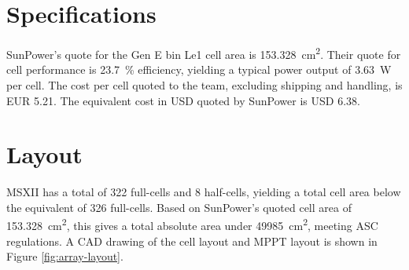 \documentclass[10pt]{article}
\begin{document}
\section{Specifications}
SunPower's quote for the Gen E bin Le1 cell area is \SI{153.328}{\centi\metre\squared}.
Their quote for cell performance is \SI{23.7}{\percent} efficiency, yielding a typical power output of \SI{3.63}{\watt} per cell.
The cost per cell quoted to the team, excluding shipping and handling, is EUR 5.21. The equivalent cost in USD quoted by SunPower is USD 6.38.

\section{Layout}
MSXII has a total of 322 full-cells and 8 half-cells, yielding a total cell area below the equivalent of 326 full-cells. Based on SunPower's quoted cell area of \SI{153.328}{\centi\metre\squared}, this gives a total absolute area under \SI{49985}{\centi\metre\squared}, meeting ASC regulations. A CAD drawing of the cell layout and MPPT layout is shown in Figure \ref{fig:array-layout}.
\end{document}

